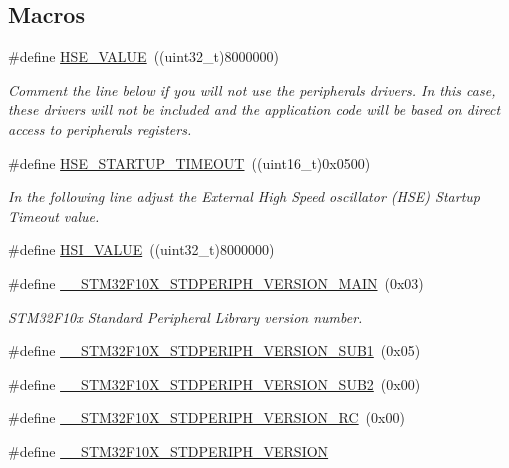 \subsection*{Macros}
\begin{DoxyCompactItemize}
\item 
\#define \hyperlink{group___library__configuration__section_gaeafcff4f57440c60e64812dddd13e7cb}{H\+S\+E\+\_\+\+V\+A\+L\+UE}~((uint32\+\_\+t)8000000)
\begin{DoxyCompactList}\small\item\em Comment the line below if you will not use the peripherals drivers. In this case, these drivers will not be included and the application code will be based on direct access to peripherals registers. \end{DoxyCompactList}\item 
\#define \hyperlink{group___library__configuration__section_ga68ecbc9b0a1a40a1ec9d18d5e9747c4f}{H\+S\+E\+\_\+\+S\+T\+A\+R\+T\+U\+P\+\_\+\+T\+I\+M\+E\+O\+UT}~((uint16\+\_\+t)0x0500)
\begin{DoxyCompactList}\small\item\em In the following line adjust the External High Speed oscillator (H\+SE) Startup Timeout value. \end{DoxyCompactList}\item 
\#define \hyperlink{group___library__configuration__section_gaaa8c76e274d0f6dd2cefb5d0b17fbc37}{H\+S\+I\+\_\+\+V\+A\+L\+UE}~((uint32\+\_\+t)8000000)
\item 
\#define \hyperlink{group___library__configuration__section_ga4c236abf68876febcb304f05ed3bafac}{\+\_\+\+\_\+\+S\+T\+M32\+F10\+X\+\_\+\+S\+T\+D\+P\+E\+R\+I\+P\+H\+\_\+\+V\+E\+R\+S\+I\+O\+N\+\_\+\+M\+A\+IN}~(0x03)
\begin{DoxyCompactList}\small\item\em S\+T\+M32\+F10x Standard Peripheral Library version number. \end{DoxyCompactList}\item 
\#define \hyperlink{group___library__configuration__section_ga7ce69a7c755b9d0551e9755d28612cb0}{\+\_\+\+\_\+\+S\+T\+M32\+F10\+X\+\_\+\+S\+T\+D\+P\+E\+R\+I\+P\+H\+\_\+\+V\+E\+R\+S\+I\+O\+N\+\_\+\+S\+U\+B1}~(0x05)
\item 
\#define \hyperlink{group___library__configuration__section_ga3ec41777ab08436b801c9c295248a6c7}{\+\_\+\+\_\+\+S\+T\+M32\+F10\+X\+\_\+\+S\+T\+D\+P\+E\+R\+I\+P\+H\+\_\+\+V\+E\+R\+S\+I\+O\+N\+\_\+\+S\+U\+B2}~(0x00)
\item 
\#define \hyperlink{group___library__configuration__section_gae0abedef178fde6294fdfd3401ef6e2c}{\+\_\+\+\_\+\+S\+T\+M32\+F10\+X\+\_\+\+S\+T\+D\+P\+E\+R\+I\+P\+H\+\_\+\+V\+E\+R\+S\+I\+O\+N\+\_\+\+RC}~(0x00)
\item 
\#define \hyperlink{group___library__configuration__section_gafb19c8675ea01accc2f8e5f467827328}{\+\_\+\+\_\+\+S\+T\+M32\+F10\+X\+\_\+\+S\+T\+D\+P\+E\+R\+I\+P\+H\+\_\+\+V\+E\+R\+S\+I\+ON}
\end{DoxyCompactItemize}


